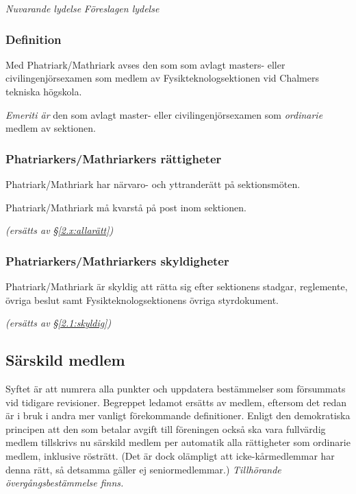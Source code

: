 \documentclass{article}
\newenvironment{lydelse}
    {\begin{paracol}{2}%
        \emph{Nuvarande lydelse}%
        \switchcolumn%
        \emph{Föreslagen lydelse}%
    \end{paracol}%
    \begin{enumerate}[label=\thesubsection.\arabic*]%
    \begin{paracol}{2}%
    }{\end{paracol}\end{enumerate}}
\newcommand{\itemb}{\item[\textbullet]}
\begin{document}
\begin{lydelse}%
  \subsubsection*{Definition}
    \itemb Med Phatriark/Mathriark avses den som som avlagt masters- eller civil\-ingenjörs\-examen som medlem av Fysik\-teknolog\-sektionen vid Ch\-al\-mers tekniska högskola.

  \switchcolumn
  \setcounter{enumi}{0}
    \item \emph{Emeriti är} den som avlagt master- eller civilingenjörsexamen som \emph{ordinarie} medlem av sektionen.
    
  \switchcolumn*
    \subsubsection*{Phatriarkers/Mathriarkers rättigheter}%
    \itemb Phatriark/Mathriark har närvaro- och yttranderätt på sektionsmöten.

    \itemb Phatriark/Mathriark må kvarstå på post inom sektionen.
    
  \switchcolumn
    \emph{(ersätts av \S \ref{2.x:allarätt})}

  \switchcolumn*
    \subsubsection*{Phatriarkers/Mathriarkers skyldigheter}%
    \itemb Phatriark/Mathriark är skyldig att rätta sig efter sektionens stadgar, reglemente, övriga beslut samt Fysikteknologsektionens övriga styrdokument.
    
  \switchcolumn
    \emph{(ersätts av \S \ref{2.1:skyldig})}
\end{lydelse}

\subsection{Särskild medlem}
Syftet är att numrera alla punkter och uppdatera bestämmelser som försummats vid tidigare revisioner.
Begreppet ledamot ersätts av medlem, eftersom det redan är i bruk i andra mer vanligt förekommande definitioner.
Enligt den demokratiska principen att den som betalar avgift till föreningen också ska vara fullvärdig medlem tillskrivs nu särskild medlem per automatik alla rättigheter som ordinarie medlem, inklusive rösträtt.
(Det är dock olämpligt att icke-kårmedlemmar har denna rätt, så detsamma gäller ej seniormedlemmar.)
\emph{Tillhörande övergångsbestämmelse finns.}
\end{document}
